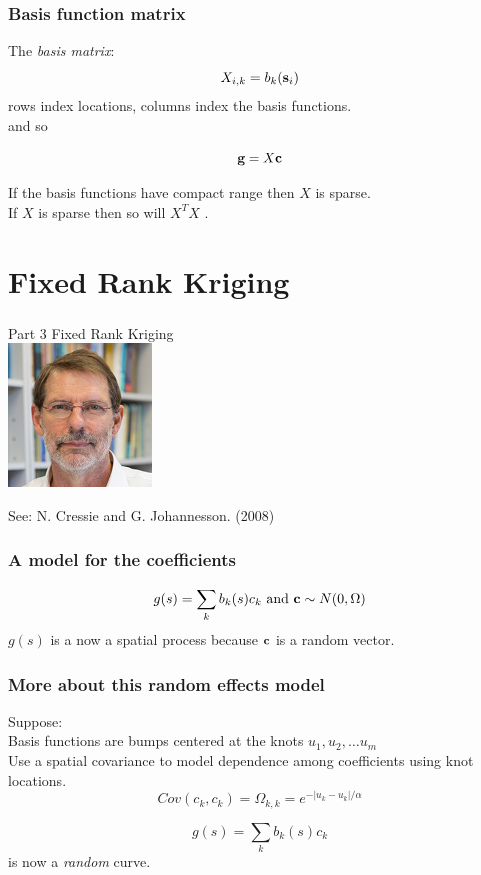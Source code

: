 \documentclass[english]{beamer} %
\def\Mycomment#1{{\color{midnightblue}{\it  {\large #1}}}}
\def\Myspace{{\vspace*{.125in}}}
\begin{document}
\begin{frame} %
\frametitle{
Basis function matrix }

The {\it basis matrix}: 
\[X_{i,k} = b_k(\mathbf{s}_i)\] 
rows index locations, columns index the basis functions. \\
\Myspace
 and  so
 
 \[\mathbf{g} = X{\mathbf{c}}  \]

\bdot If  the basis functions have compact range then $X$ is sparse. \\
\Myspace
\bdot  If $X$ is sparse then so will  $X^TX$ .


\end{frame} %



\section{Fixed Rank Kriging}
\begin{frame} %
\frametitle{}
{\huge Part 3  Fixed Rank Kriging} \\
\Myspace
\includegraphics[width=1.5in]{pix/cressie.jpg}

See: N. Cressie and G. Johannesson. (2008) 

\end{frame} 


\begin{frame} %
\frametitle{A model for the coefficients}
{\large
\[ g(s) =  \sum_k b_k(s) c_k  \mbox{ and }  \mathbf{c} \sim N( 0, \Omega) \]
\Myspace
$g(s)$ is a now a spatial process because $\mathbf{c}$ is a random vector.
}
\end{frame} %



\begin{frame} %
\frametitle{More about this random effects model}
Suppose:  \\
\Myspace
\bdot Basis functions are bumps centered at the knots $u_1, u_2, \ldots u_m$  \\
\Myspace
\bdot Use a spatial covariance to model dependence among coefficients using knot locations. \\
\Myspace
\Mycomment{An Example of $\Omega$ } 
\[ Cov( c_k, c_k ) = \Omega_{k,k} =  e^{ -| u_k - u_k |/ \alpha } \]

\[ g(s) =  \sum_k b_k(s) c_k \]
is now a {\it random} curve. 
\end{frame} %
\end{document}
